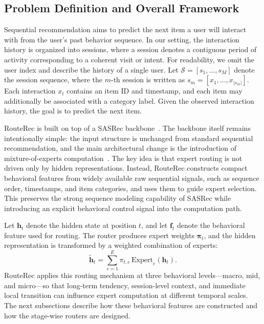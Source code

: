 \documentclass[sigconf,anonymous,review]{acmart}
\begin{document}
\subsection{Problem Definition and Overall Framework}
\label{sec:problem-framework}

Sequential recommendation aims to predict the next item a user will interact with from the user's past behavior sequence. In our setting, the interaction history is organized into sessions, where a session denotes a contiguous period of activity corresponding to a coherent visit or intent. For readability, we omit the user index and describe the history of a single user. Let $\mathcal{S} = [s_1, \dots, s_M]$ denote the session sequence, where the $m$-th session is written as $s_m = [x_1, \dots, x_{|s_m|}]$. Each interaction $x_t$ contains an item ID and timestamp, and each item may additionally be associated with a category label. Given the observed interaction history, the goal is to predict the next item.

RouteRec is built on top of a SASRec backbone~\cite{kang2018sasrec}. The backbone itself remains intentionally simple: the input structure is unchanged from standard sequential recommendation, and the main architectural change is the introduction of mixture-of-experts computation~\cite{jordan1994hme,shazeer2017moe,fedus2022switch}. The key idea is that expert routing is not driven only by hidden representations. Instead, RouteRec constructs compact behavioral features from widely available raw sequential signals, such as sequence order, timestamps, and item categories, and uses them to guide expert selection. This preserves the strong sequence modeling capability of SASRec while introducing an explicit behavioral control signal into the computation path.

Let $\mathbf{h}_t$ denote the hidden state at position $t$, and let $\mathbf{f}_t$ denote the behavioral feature used for routing. The router produces expert weights $\boldsymbol{\pi}_t$, and the hidden representation is transformed by a weighted combination of experts:
\[
\tilde{\mathbf{h}}_t
=
\sum_{e=1}^{E}
\pi_{t,e}\,\mathrm{Expert}_e(\mathbf{h}_t).
\]
RouteRec applies this routing mechanism at three behavioral levels---macro, mid, and micro---so that long-term tendency, session-level context, and immediate local transition can influence expert computation at different temporal scales. The next subsections describe how these behavioral features are constructed and how the stage-wise routers are designed.
\end{document}
